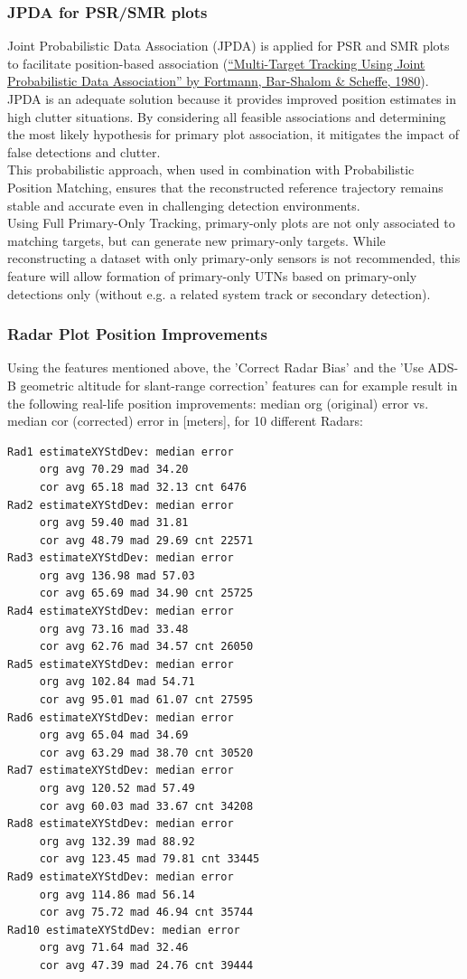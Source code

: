 \subsubsection{JPDA for PSR/SMR plots}

Joint Probabilistic Data Association (JPDA) is applied for PSR and SMR plots to facilitate position-based association (\href{https://doi.org/10.1109/CDC.1980.271915}{“Multi-Target Tracking Using Joint Probabilistic Data Association” by Fortmann, Bar-Shalom \& Scheffe, 1980}). JPDA is an adequate solution because it provides improved position estimates in high clutter situations. By considering all feasible associations and determining the most likely hypothesis for primary plot association, it mitigates the impact of false detections and clutter. \\

This probabilistic approach, when used in combination with Probabilistic Position Matching, ensures that the reconstructed reference trajectory remains stable and accurate even in challenging detection environments. \\

Using Full Primary-Only Tracking, primary-only plots are not only associated to matching targets, but can generate new primary-only targets. While reconstructing a dataset with only primary-only sensors is not recommended, this feature will allow formation of primary-only UTNs based on primary-only detections only (without e.g. a related system track or secondary detection).

\subsubsection{Radar Plot Position Improvements}

Using the features mentioned above, the 'Correct Radar Bias' and the 'Use ADS-B geometric altitude for slant-range correction' features can for example result in the following real-life position improvements: 
median org (original) error vs. median cor (corrected) error in [meters], for 10 different Radars:

\begin{lstlisting}
Rad1 estimateXYStdDev: median error
	 org avg 70.29 mad 34.20
	 cor avg 65.18 mad 32.13 cnt 6476
Rad2 estimateXYStdDev: median error
	 org avg 59.40 mad 31.81
	 cor avg 48.79 mad 29.69 cnt 22571
Rad3 estimateXYStdDev: median error
	 org avg 136.98 mad 57.03
	 cor avg 65.69 mad 34.90 cnt 25725
Rad4 estimateXYStdDev: median error
	 org avg 73.16 mad 33.48
	 cor avg 62.76 mad 34.57 cnt 26050
Rad5 estimateXYStdDev: median error
	 org avg 102.84 mad 54.71
	 cor avg 95.01 mad 61.07 cnt 27595
Rad6 estimateXYStdDev: median error
	 org avg 65.04 mad 34.69
	 cor avg 63.29 mad 38.70 cnt 30520
Rad7 estimateXYStdDev: median error
	 org avg 120.52 mad 57.49
	 cor avg 60.03 mad 33.67 cnt 34208
Rad8 estimateXYStdDev: median error
	 org avg 132.39 mad 88.92
	 cor avg 123.45 mad 79.81 cnt 33445
Rad9 estimateXYStdDev: median error
	 org avg 114.86 mad 56.14
	 cor avg 75.72 mad 46.94 cnt 35744
Rad10 estimateXYStdDev: median error
	 org avg 71.64 mad 32.46
	 cor avg 47.39 mad 24.76 cnt 39444
\end{lstlisting}

